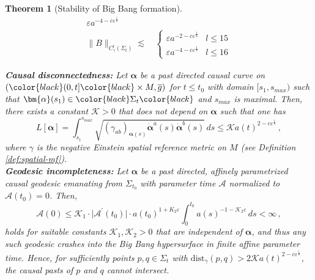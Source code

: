 \documentclass[11pt,leqno,textwidth=10cm]{amsart}
\numberwithin{equation}{section}
\theoremstyle{definition}
\theoremstyle{plain}
\newtheorem{theorem}[definition]{Theorem}
\newcommand{\1}{\mathbbm{1}}
\newcommand{\g}{\overline{g}}
\renewcommand{\epsilon}{\varepsilon}
\newcommand{\curve}{\bm{\alpha}}
\newcommand{\change}[1]{\color{black}#1\color{black}}
\begin{document}
\begin{theorem}[Stability of Big Bang formation]
\begin{subequations}
\begin{align}
\epsilon a^{-4-c\epsilon^\frac18}%
\\
\label{eq:asymp-B}\|B\|_{C^l_\gamma(\Sigma_t)}\lesssim&\,\begin{cases}
\epsilon a^{-2-c{\epsilon}^\frac18} & l\leq 15\\
\epsilon a^{-4-c\epsilon^\frac18} & l\leq 16
\end{cases}
\end{align}
\end{subequations}

\textbf{Causal disconnectedness:} Let $\curve$ be a past directed causal curve on $(\change{(0,t]}\times M,\g)$\change{ for $t\leq t_0$ }with domain $[s_1,s_{max})$ such that $\curve(s_1)\in \change{\Sigma_{t}}$ and $s_{max}$ is maximal. Then, there exists a constant $\mathcal{K}>0$ that does not depend on $\curve$ such that one has
\begin{equation}\label{eq:causal-disconn}
L[\curve]=\int_{s_1}^{s_{max}}\sqrt{(\gamma_{ab})_{\curve(s)}\dot{\curve}^a(s)\dot{\curve}^b(s)}\,ds\leq \mathcal{K} a(t)^{2-c\epsilon^\frac18}\,,
\end{equation}
where $\gamma$ is the negative Einstein spatial reference metric on $M$ (see Definition \ref{def:spatial-mf}).\\

\textbf{Geodesic incompleteness:} Let $\curve$ be a past directed, affinely parametrized causal geodesic emanating from $\Sigma_{t_0}$ with parameter time $\mathcal{A}$ normalized to $\mathcal{A}(t_0)=0$. Then,
\begin{equation}\label{eq:geod-incomp}
\mathcal{A}(0)\leq \mathcal{K}_1\cdot \lvert \mathcal{A}^\prime(t_0)\rvert \cdot a(t_0)^{1+K_2\epsilon}\int_0^{t_0}a(s)^{-1-\mathcal{K}_2\epsilon}\,ds<\infty\,,
\end{equation}
holds for suitable constants $\mathcal{K}_1,\mathcal{K}_2>0$ that are independent of $\curve$, and thus any such geodesic crashes into the Big Bang hypersurface in finite affine parameter time. \change{Hence, for sufficiently points $p,q\in\Sigma_t$ with $\text{dist}_\gamma(p,q)>2\mathcal{K}a(t)^{2-c\epsilon^\frac18}$, the causal pasts of $p$ and $q$ cannot intersect.}\\


\end{theorem}
\end{document}
